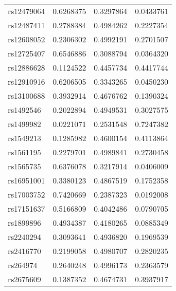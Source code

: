 \documentclass[
]{article}
\theoremstyle{plain}
\begin{document}
{\begin{table}[H]
\begin{minipage}{0.5\linewidth}
\begin{table}[H]
\begin{tabular}{lrrr}
rs12479064 & 0.6268375 & 0.3297864 & 0.0433761\\
rs12487411 & 0.2788384 & 0.4984262 & 0.2227354\\
rs12608052 & 0.2306302 & 0.4992191 & 0.2701507\\
\addlinespace
rs12725407 & 0.6546886 & 0.3088794 & 0.0364320\\
rs12886628 & 0.1124522 & 0.4457734 & 0.4417744\\
rs12910916 & 0.6206505 & 0.3343265 & 0.0450230\\
rs13100688 & 0.3932914 & 0.4676762 & 0.1390324\\
rs1492546 & 0.2022894 & 0.4949531 & 0.3027575\\
\addlinespace
rs1499982 & 0.0221071 & 0.2531548 & 0.7247382\\
rs1549213 & 0.1285982 & 0.4600154 & 0.4113864\\
rs1561195 & 0.2279701 & 0.4989841 & 0.2730458\\
rs1565735 & 0.6376078 & 0.3217914 & 0.0406009\\
rs16951001 & 0.3380123 & 0.4867519 & 0.1752358\\
\addlinespace
rs17003752 & 0.7420669 & 0.2387323 & 0.0192008\\
rs17151637 & 0.5166809 & 0.4042486 & 0.0790705\\
rs1899896 & 0.4934387 & 0.4180265 & 0.0885349\\
rs2240294 & 0.3093641 & 0.4936820 & 0.1969539\\
rs2416770 & 0.2199058 & 0.4980707 & 0.2820235\\
\addlinespace
rs264974 & 0.2640248 & 0.4996173 & 0.2363579\\
rs2675609 & 0.1387352 & 0.4674731 & 0.3937917\\
\bottomrule
\end{tabular}
\end{table}



\end{minipage}
\end{table}}
\end{document}
